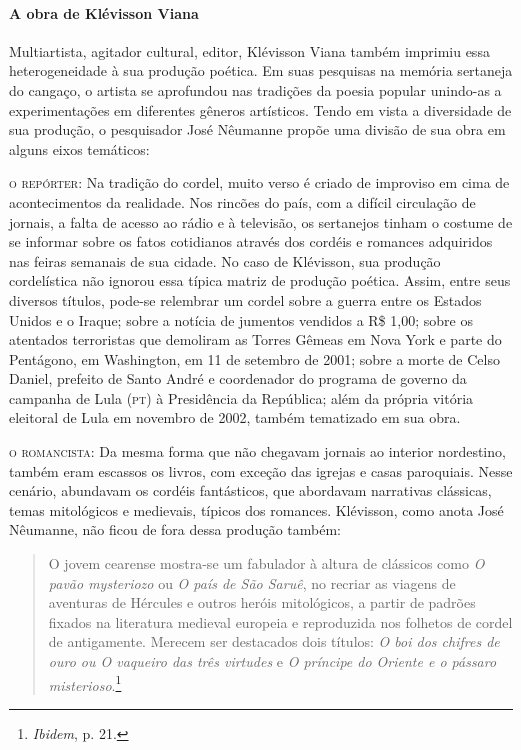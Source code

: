 \documentclass[11pt]{extarticle}
\begin{document}
\paragraph{A obra de Klévisson Viana}
Multiartista, agitador cultural, editor, Klévisson Viana também imprimiu essa heterogeneidade à sua produção poética. Em suas pesquisas na memória sertaneja do cangaço, o artista se aprofundou  nas tradições da poesia popular unindo-as a experimentações em diferentes gêneros artísticos. 
Tendo em vista a diversidade de sua produção, o pesquisador José Nêumanne propõe uma divisão de sua obra em alguns eixos temáticos:

\noindent\textsc{o repórter}: Na tradição do cordel, muito verso é criado de improviso em cima de acontecimentos da realidade. Nos rincões do país, com a difícil circulação de jornais, a falta de acesso ao rádio e à televisão, os sertanejos tinham o costume de se informar sobre os fatos cotidianos através dos cordéis e romances adquiridos nas feiras semanais de sua cidade.
No caso de Klévisson, sua produção cordelística não ignorou essa típica matriz de produção poética. Assim, entre seus diversos títulos, pode-se relembrar um cordel sobre a guerra entre os Estados Unidos e o Iraque; sobre a notícia de jumentos vendidos a R\$ 1,00; sobre 
os atentados terroristas que demoliram as Torres Gêmeas em Nova York e parte do Pentágono, em Washington, em 11 de setembro de 2001; sobre a morte de Celso Daniel, prefeito de Santo André e coordenador do programa de governo da campanha de Lula (\textsc{pt}) à Presidência da República; além da própria vitória eleitoral de Lula em novembro de 2002, também tematizado em sua obra.

\noindent\textsc{o romancista}: Da mesma forma que não chegavam jornais ao interior nordestino, também eram escassos os livros, com exceção das igrejas e casas paroquiais.
Nesse cenário, abundavam os cordéis fantásticos, que abordavam narrativas clássicas, temas mitológicos e medievais, típicos dos romances. 
Klévisson, como anota José Nêumanne, não ficou de fora dessa produção também:

\begin{quote}
O jovem cearense mostra-se um fabulador à altura de clássicos como \textit{O pavão mysteriozo} ou \textit{O país de São Saruê}, no recriar as viagens de aventuras de Hércules e outros heróis mitológicos, a partir de padrões fixados na literatura medieval europeia e reproduzida nos folhetos de cordel de antigamente. Merecem ser destacados dois títulos: \textit{O boi dos chifres de ouro ou O vaqueiro das três virtudes} e \textit{O príncipe do Oriente e o pássaro misterioso}.\footnote{\textit{Ibidem}, p. 21.}
\end{quote}
\end{document}
